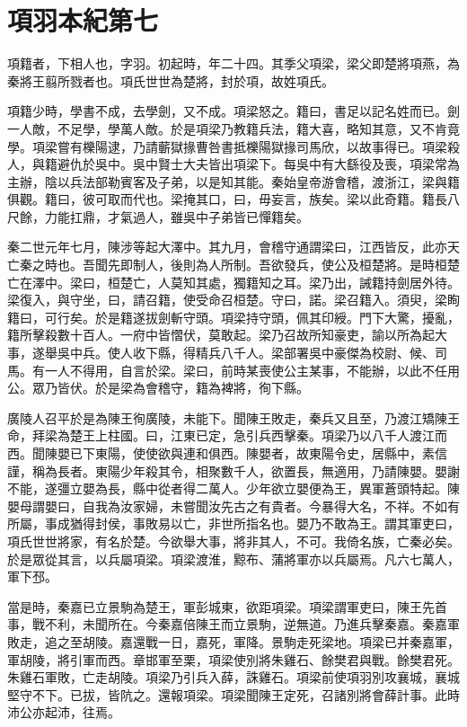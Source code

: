 \chapter{項羽本紀第七}

項籍者，下相人也，字羽。初起時，年二十四。其季父項梁，梁父即楚將項燕，為秦將王翦所戮者也。項氏世世為楚將，封於項，故姓項氏。

項籍少時，學書不成，去學劍，又不成。項梁怒之。籍曰，書足以記名姓而已。劍一人敵，不足學，學萬人敵。於是項梁乃教籍兵法，籍大喜，略知其意，又不肯竟學。項梁嘗有櫟陽逮，乃請蘄獄掾曹咎書抵櫟陽獄掾司馬欣，以故事得已。項梁殺人，與籍避仇於吳中。吳中賢士大夫皆出項梁下。每吳中有大繇役及喪，項梁常為主辦，陰以兵法部勒賓客及子弟，以是知其能。秦始皇帝游會稽，渡浙江，梁與籍俱觀。籍曰，彼可取而代也。梁掩其口，曰，毋妄言，族矣。梁以此奇籍。籍長八尺餘，力能扛鼎，才氣過人，雖吳中子弟皆已憚籍矣。

秦二世元年七月，陳涉等起大澤中。其九月，會稽守通謂梁曰，江西皆反，此亦天亡秦之時也。吾聞先即制人，後則為人所制。吾欲發兵，使公及桓楚將。是時桓楚亡在澤中。梁曰，桓楚亡，人莫知其處，獨籍知之耳。梁乃出，誡籍持劍居外待。梁復入，與守坐，曰，請召籍，使受命召桓楚。守曰，諾。梁召籍入。須臾，梁眴籍曰，可行矣。於是籍遂拔劍斬守頭。項梁持守頭，佩其印綬。門下大驚，擾亂，籍所擊殺數十百人。一府中皆慴伏，莫敢起。梁乃召故所知豪吏，諭以所為起大事，遂舉吳中兵。使人收下縣，得精兵八千人。梁部署吳中豪傑為校尉、候、司馬。有一人不得用，自言於梁。梁曰，前時某喪使公主某事，不能辦，以此不任用公。眾乃皆伏。於是梁為會稽守，籍為裨將，徇下縣。

廣陵人召平於是為陳王徇廣陵，未能下。聞陳王敗走，秦兵又且至，乃渡江矯陳王命，拜梁為楚王上柱國。曰，江東已定，急引兵西擊秦。項梁乃以八千人渡江而西。聞陳嬰已下東陽，使使欲與連和俱西。陳嬰者，故東陽令史，居縣中，素信謹，稱為長者。東陽少年殺其令，相聚數千人，欲置長，無適用，乃請陳嬰。嬰謝不能，遂彊立嬰為長，縣中從者得二萬人。少年欲立嬰便為王，異軍蒼頭特起。陳嬰母謂嬰曰，自我為汝家婦，未嘗聞汝先古之有貴者。今暴得大名，不祥。不如有所屬，事成猶得封侯，事敗易以亡，非世所指名也。嬰乃不敢為王。謂其軍吏曰，項氏世世將家，有名於楚。今欲舉大事，將非其人，不可。我倚名族，亡秦必矣。於是眾從其言，以兵屬項梁。項梁渡淮，黥布、蒲將軍亦以兵屬焉。凡六七萬人，軍下邳。

當是時，秦嘉已立景駒為楚王，軍彭城東，欲距項梁。項梁謂軍吏曰，陳王先首事，戰不利，未聞所在。今秦嘉倍陳王而立景駒，逆無道。乃進兵擊秦嘉。秦嘉軍敗走，追之至胡陵。嘉還戰一日，嘉死，軍降。景駒走死梁地。項梁已并秦嘉軍，軍胡陵，將引軍而西。章邯軍至栗，項梁使別將朱雞石、餘樊君與戰。餘樊君死。朱雞石軍敗，亡走胡陵。項梁乃引兵入薛，誅雞石。項梁前使項羽別攻襄城，襄城堅守不下。已拔，皆阬之。還報項梁。項梁聞陳王定死，召諸別將會薛計事。此時沛公亦起沛，往焉。

